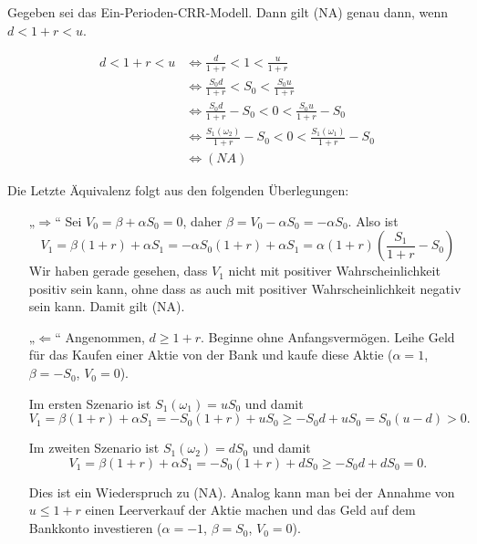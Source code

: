 \documentclass[a4paper,twoside,DIV15,BCOR12mm]{scrbook}
\begin{document}
\begin{lemma}
Gegeben sei das Ein-Perioden-CRR-Modell. Dann gilt (NA) genau dann, wenn $d< 1+ r < u$.
\end{lemma}
\begin{beweis}
\begin{align*}
d < 1+r < u &\iff \frac d{1+r} < 1 < \frac u{1+r} \\
&\iff \frac{S_0 d}{1+r} < S_0 < \frac{S_0 u}{1+r} \\
&\iff \frac{S_0 d}{1+r} - S_0 < 0 < \frac{S_0 u}{1+r} - S_0 \\
&\iff \frac{S_1(\omega_2)}{1+r} - S_0 < 0 < \frac{S_1(\omega_1)}{1+r} - S_0 \\
&\iff (NA)
\end{align*}

Die Letzte Äquivalenz folgt aus den folgenden Überlegungen:
\begin{itemize}
\item[„$\Longrightarrow$“] Sei $V_0 = \beta + \alpha S_0 = 0$, daher $\beta = V_0- \alpha S_0 = -\alpha S_0$. Also ist 
\[
V_1=\beta(1+r) + \alpha S_1 = -\alpha S_0(1+r) + \alpha S_1 = \alpha (1+r)(\frac{S_1}{1+r} - S_0)
\]
Wir haben gerade gesehen, dass $V_1$ nicht mit positiver Wahrscheinlichkeit positiv sein kann, ohne dass as auch mit positiver Wahrscheinlichkeit negativ sein kann. Damit gilt (NA).
\item[„$\Longleftarrow$“] Angenommen, $d\ge 1+ r$. Beginne ohne Anfangsvermögen. Leihe Geld für das Kaufen einer Aktie von der Bank und kaufe diese Aktie ($\alpha = 1$, $\beta = -S_0$, $V_0=0$). 

Im ersten Szenario ist $S_1(\omega_1) = uS_0$ und damit
\[V_1=\beta(1+r) + \alpha S_1 = -S_0(1+r) + u S_0 \ge - S_0d + uS_0 = S_0(u-d) > 0.\]

Im zweiten Szenario ist $S_1(\omega_2) = dS_0$ und damit 
\[V_1=\beta(1+r) + \alpha S_1 = -S_0(1+r) + d S_0 \ge - S_0d + dS_0 = 0.\]

Dies ist ein Wiederspruch zu (NA). Analog kann man bei der Annahme von $u\le 1+r$ einen Leerverkauf der Aktie machen und das Geld auf dem Bankkonto investieren ($\alpha = -1$, $\beta = S_0$, $V_0=0$).
\end{itemize}
\end{beweis}
\end{document}
